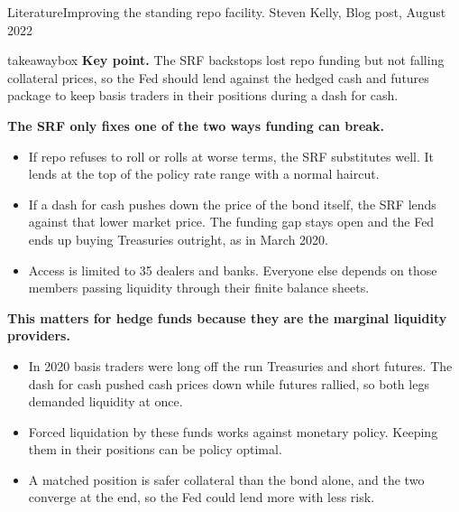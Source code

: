\documentclass[aspectratio=169,11pt]{beamer}
\newcommand{\keypoint}[1]{%
  \begin{beamercolorbox}[sep=0.6em,wd=\textwidth]{takeawaybox}
    \textbf{Key point.} #1
  \end{beamercolorbox}}
\begin{document}
\begin{frame}{Literature}{Improving the standing repo facility. Steven Kelly, Blog post, August 2022}
  \footnotesize
  \keypoint{The SRF backstops lost repo funding but not falling collateral prices, so the Fed should lend against the hedged cash and futures package to keep basis traders in their positions during a dash for cash.}
  \medskip
  \textbf{The SRF only fixes one of the two ways funding can break.}
  \begin{itemize}
    \item If repo refuses to roll or rolls at worse terms, the SRF substitutes well. It lends at the top of the policy rate range with a normal haircut.
    \item If a dash for cash pushes down the price of the bond itself, the SRF lends against that lower market price. The funding gap stays open and the Fed ends up buying Treasuries outright, as in March 2020.
    \item Access is limited to 35 dealers and banks. Everyone else depends on those members passing liquidity through their finite balance sheets.
  \end{itemize}
  \smallskip
  \textbf{This matters for hedge funds because they are the marginal liquidity providers.}
  \begin{itemize}
    \item In 2020 basis traders were long off the run Treasuries and short futures. The dash for cash pushed cash prices down while futures rallied, so both legs demanded liquidity at once.
    \item Forced liquidation by these funds works against monetary policy. Keeping them in their positions can be policy optimal.
    \item A matched position is safer collateral than the bond alone, and the two converge at the end, so the Fed could lend more with less risk. 
  \end{itemize}
\end{frame}
\end{document}
